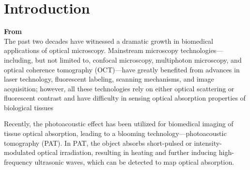 \section{Introduction}
\label{sec:Introduction}

\textbf{From \cite{2012_Liang_BiomedicalOpticalImaging}\\
}The past two decades have witnessed a dramatic growth in biomedical applications of optical microscopy. Mainstream microscopy technologies—including, but not limited to, confocal microscopy, multiphoton microscopy, and optical coherence tomography (OCT)—have greatly benefited from advances in laser technology, fluorescent labeling, scanning mechanisms, and image acquisition; however, all these technologies rely on either optical scattering or fluorescent contrast and have difficulty in sensing optical absorption properties of biological tissues \cite{2010_Hu_Photoacousticimagingand}

Recently, the photoacoustic effect has been utilized for biomedical imaging of tissue optical absorption, leading to a blooming technology—photoacoustic tomography (PAT). In PAT, the object absorbs short-pulsed or intensity-modulated optical irradiation, resulting in heating and further inducing high-frequency ultrasonic waves, which can be detected to map optical absorption.



